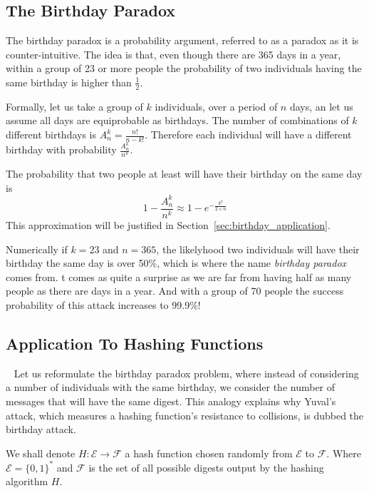 \subsection{The Birthday Paradox}
The birthday paradox is a probability argument, referred to as a paradox as it is counter-intuitive.
The idea is that, even though there are 365 days in a year, within a group of 23 or more people the probability of two individuals having the same birthday is higher than $\frac{1}{2}$.

Formally, let us take a group of $k$ individuals, over a period of $n$ days, an let us assume all days are equiprobable as birthdays.
The number of combinations of $k$ different birthdays is $A_n^k=\frac{n!}{n-k!}$. Therefore each individual will have a different birthday with probability $\frac{A_n^k}{n^k}$.

The probability that two people at least will have their birthday on the same day is $$1-\frac{A_n^k}{n^k} \approx 1 - e^{-\frac{k^2}{2 \times n}}$$
This approximation will be justified in Section~\ref{sec:birthday_application}.

Numerically if $k=23$ and $n=365$, the likelyhood two individuals will have their birthday the same day is over 50\%, which is where the name \emph{birthday paradox} comes from. t comes as quite a surprise as we are far from having half as many people as there are days in a year. 
And with a group of 70 people the success probability of this attack increases to 99.9\%!

\subsection{Application To Hashing Functions}~\label{sec:birthday_application}
Let us reformulate the birthday paradox problem, where instead of considering a number of individuals with the same birthday, we consider the number of messages that will have the same digest. This analogy explains why Yuval's attack, which measures a hashing function's resistance to collisions, is dubbed the birthday attack.

We shall denote $H:\mathcal{E} \rightarrow \mathcal{F}$ a hash function chosen randomly from $\mathcal{E}$ to $\mathcal{F}$. Where $\mathcal{E}={\{0,1\}}^*$ and $\mathcal{F}$ is the set of all possible digests output by the hashing algorithm $H$.

